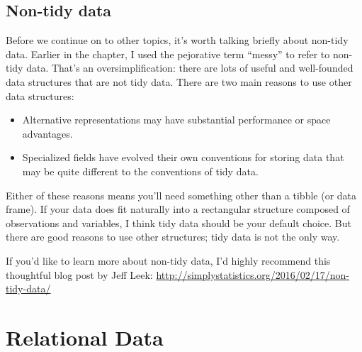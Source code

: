 \documentclass[]{book}
\newenvironment{Shaded}{\begin{snugshade}}{\end{snugshade}}
\newcommand{\CommentTok}[1]{\textcolor[rgb]{0.56,0.35,0.01}{\textit{#1}}}
\newcommand{\KeywordTok}[1]{\textcolor[rgb]{0.13,0.29,0.53}{\textbf{#1}}}
\newcommand{\NormalTok}[1]{#1}
\newcommand{\OperatorTok}[1]{\textcolor[rgb]{0.81,0.36,0.00}{\textbf{#1}}}
\newcommand{\StringTok}[1]{\textcolor[rgb]{0.31,0.60,0.02}{#1}}
\theoremstyle{definition}
\theoremstyle{definition}
\theoremstyle{definition}
\theoremstyle{remark}
\begin{document}
\begin{Shaded}
\end{Shaded}

\hypertarget{non-tidy-data}{%
\section{Non-tidy data}\label{non-tidy-data}}

Before we continue on to other topics, it's worth talking briefly about
non-tidy data. Earlier in the chapter, I used the pejorative term
``messy'' to refer to non-tidy data. That's an oversimplification: there
are lots of useful and well-founded data structures that are not tidy
data. There are two main reasons to use other data structures:

\begin{itemize}
\item
  Alternative representations may have substantial performance or space
  advantages.
\item
  Specialized fields have evolved their own conventions for storing data
  that may be quite different to the conventions of tidy data.
\end{itemize}

Either of these reasons means you'll need something other than a tibble
(or data frame). If your data does fit naturally into a rectangular
structure composed of observations and variables, I think tidy data
should be your default choice. But there are good reasons to use other
structures; tidy data is not the only way.

If you'd like to learn more about non-tidy data, I'd highly recommend
this thoughtful blog post by Jeff Leek:
\url{http://simplystatistics.org/2016/02/17/non-tidy-data/}

\hypertarget{relational-data}{%
\chapter{Relational Data}\label{relational-data}}
\end{document}
